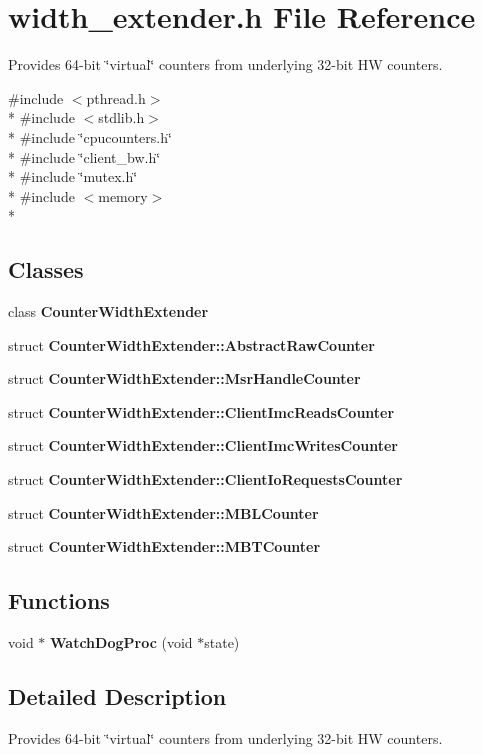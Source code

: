 \section{width\+\_\+extender.\+h File Reference}
\label{width__extender_8h}


Provides 64-\/bit \char`\"{}virtual\char`\"{} counters from underlying 32-\/bit HW counters.  


{\ttfamily \#include $<$pthread.\+h$>$}\\*
{\ttfamily \#include $<$stdlib.\+h$>$}\\*
{\ttfamily \#include \char`\"{}cpucounters.\+h\char`\"{}}\\*
{\ttfamily \#include \char`\"{}client\+\_\+bw.\+h\char`\"{}}\\*
{\ttfamily \#include \char`\"{}mutex.\+h\char`\"{}}\\*
{\ttfamily \#include $<$memory$>$}\\*
\subsection*{Classes}
\begin{DoxyCompactItemize}
\item 
class {\bf Counter\+Width\+Extender}
\item 
struct {\bf Counter\+Width\+Extender\+::\+Abstract\+Raw\+Counter}
\item 
struct {\bf Counter\+Width\+Extender\+::\+Msr\+Handle\+Counter}
\item 
struct {\bf Counter\+Width\+Extender\+::\+Client\+Imc\+Reads\+Counter}
\item 
struct {\bf Counter\+Width\+Extender\+::\+Client\+Imc\+Writes\+Counter}
\item 
struct {\bf Counter\+Width\+Extender\+::\+Client\+Io\+Requests\+Counter}
\item 
struct {\bf Counter\+Width\+Extender\+::\+M\+B\+L\+Counter}
\item 
struct {\bf Counter\+Width\+Extender\+::\+M\+B\+T\+Counter}
\end{DoxyCompactItemize}
\subsection*{Functions}
\begin{DoxyCompactItemize}
\item 
void $\ast$ {\bfseries Watch\+Dog\+Proc} (void $\ast$state)\label{width__extender_8h_a13b3112e6cc7354fd6fb7c7605c781f4}

\end{DoxyCompactItemize}


\subsection{Detailed Description}
Provides 64-\/bit \char`\"{}virtual\char`\"{} counters from underlying 32-\/bit HW counters. 

